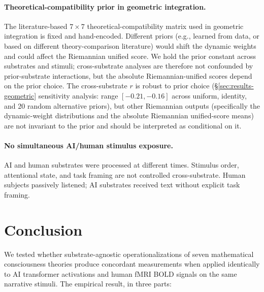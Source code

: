 \documentclass[11pt,a4paper]{article}
\begin{document}
\paragraph{Theoretical-compatibility prior in geometric integration.} The literature-based $7 \times 7$ theoretical-compatibility matrix used in geometric integration is fixed and hand-encoded. Different priors (e.g., learned from data, or based on different theory-comparison literature) would shift the dynamic weights and could affect the Riemannian unified score. We hold the prior constant across substrates and stimuli; cross-substrate analyses are therefore not confounded by prior-substrate interactions, but the absolute Riemannian-unified scores depend on the prior choice. The cross-substrate $r$ is robust to prior choice (\S\ref{sec:results-geometric} sensitivity analysis: range $[-0.21, -0.16]$ across uniform, identity, and 20 random alternative priors), but other Riemannian outputs (specifically the dynamic-weight distributions and the absolute Riemannian unified-score means) are not invariant to the prior and should be interpreted as conditional on it.

\paragraph{No simultaneous AI/human stimulus exposure.} AI and human substrates were processed at different times. Stimulus order, attentional state, and task framing are not controlled cross-substrate. Human subjects passively listened; AI substrates received text without explicit task framing.

\section{Conclusion}

We tested whether substrate-agnostic operationalizations of seven mathematical consciousness theories produce concordant measurements when applied identically to AI transformer activations and human fMRI BOLD signals on the same narrative stimuli. The empirical result, in three parts:
\end{document}
